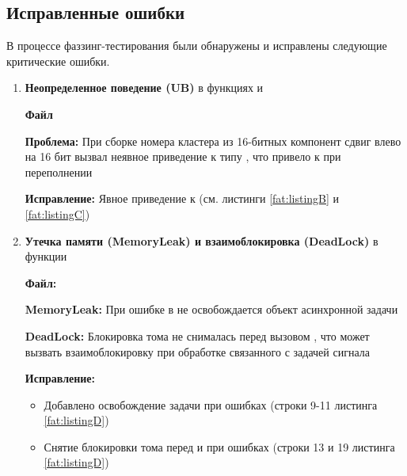 \subsection{Исправленные ошибки}

В процессе фаззинг-тестирования были обнаружены и исправлены следующие критические ошибки.

\begin{enumerate}
	\item \textbf{Неопределенное поведение (UB)} в функциях  и  
	
	\textbf{Файл} 
	
	\textbf{Проблема:} При сборке номера кластера  из 16-битных компонент сдвиг влево на 16 бит вызвал неявное приведение к типу , что привело к  при переполнении \cite{ISO_C17}
	
	\textbf{Исправление:} Явное приведение к  (см. листинги \ref{fat:listingB} и \ref{fat:listingC})
	 
	 
	
	\item \textbf{Утечка памяти (MemoryLeak) и взаимоблокировка (DeadLock)} в функции 
	
	\textbf{Файл:} 
	
	\textbf{MemoryLeak:} При ошибке в  не освобождается объект асинхронной задачи
	
	\textbf{DeadLock:} Блокировка тома не снималась перед вызовом , что может вызвать взаимоблокировку при обработке связанного с задачей сигнала
	
	\textbf{Исправление:}
	\begin{itemize}
		\item Добавлено освобождение задачи при ошибках (строки 9-11 листинга \ref{fat:listingD})
		\item Снятие блокировки тома перед  и при ошибках (строки 13 и 19 листинга  \ref{fat:listingD})
	\end{itemize}
	 
	

\end{enumerate}

